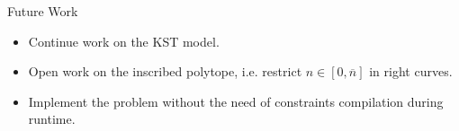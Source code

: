 \documentclass[shortpres,aspectratio=43]{beamer}
\begin{document}
\begin{frame}{Future Work}
  \begin{itemize}
    \item Continue work on the KST model.
    \item Open work on the inscribed polytope, i.e. restrict $n\in[0,\overline{n}]$ in right curves.
    \item Implement the problem without the need of constraints compilation during runtime.
  \end{itemize}
\end{frame}
\end{document}
